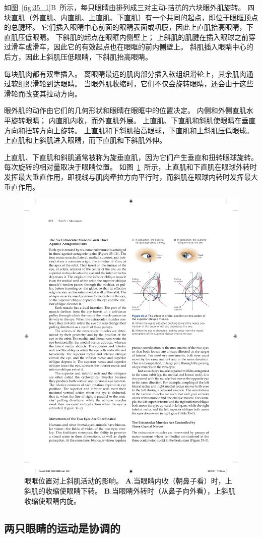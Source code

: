 如图~\ref{fig:35_1}B~所示，每只眼睛由排列成三对主动-拮抗的六块眼外肌旋转。
四块直肌（外直肌、内直肌、上直肌、下直肌）有一个共同的起点，即位于眼眶顶点的总腱环。
它们插入眼睛中心前面的眼睛表面或巩膜，因此上直肌抬高眼睛，下直肌压低眼睛。
下斜肌的起点在眼眶内侧壁上；
上斜肌的肌腱在插入眼球之前穿过滑车或滑车，因此它的有效起点也在眼眶的前内侧壁上。
斜肌插入眼睛中心的后方，因此上斜肌压低眼睛，下斜肌抬高眼睛。


每块肌肉都有双重插入。
离眼睛最远的肌肉部分插入软组织滑轮上，其余肌肉通过软组织滑轮到达眼睛。
当眼外肌收缩时，它们不仅会旋转眼睛，还会由于这些滑轮而改变其拉动方向。


眼外肌的动作由它们的几何形状和眼睛在眼眶中的位置决定。
内侧和外侧直肌水平旋转眼睛；
内直肌内收，而外直肌外展。
上直肌、下直肌和斜肌使眼睛在垂直方向和扭转方向上旋转。
上直肌和下斜肌抬高眼球，下直肌和上斜肌压低眼球。
上直肌和上斜肌进入眼睛，而下直肌和下斜肌外伸。


上直肌、下直肌和斜肌通常被称为旋垂直肌，因为它们产生垂直和扭转眼球旋转。
每次旋转的相对量取决于眼睛位置。
如图~\ref{fig:35_2}~所示，上直肌和下直肌在眼球外转时发挥最大垂直作用，即视线与肌肉牵拉方向平行时，而斜肌在眼球内转时发挥最大垂直作用。


\begin{figure}[htbp]
	\centering
	\includegraphics[width=0.5\linewidth]{chap35/fig_35_2}
	\caption{眼眶位置对上斜肌活动的影响。
		\textbf{A}.当眼睛内收（朝鼻子看）时，上斜肌的收缩使眼睛下转。
		\textbf{B}.当眼睛外转时（从鼻子向外看），上斜肌收缩使眼睛内旋。}
	\label{fig:35_2}
\end{figure}



\subsection{两只眼睛的运动是协调的}

